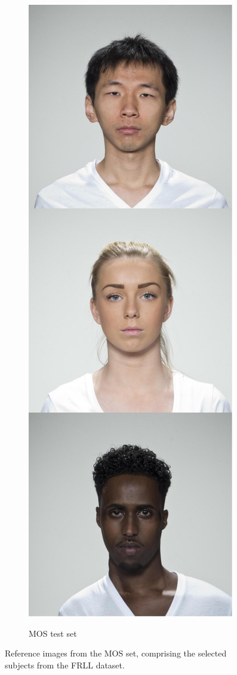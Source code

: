 \begin{figure}
\begin{subfigure}[t]{0.19\textwidth}
        \includegraphics[width=\textwidth]{images/mos_test_set.pdf}\\
        \caption{MOS test set}\label{fig:mos_set_test}
    \end{subfigure}
    \caption{Reference images from the MOS set, comprising the selected subjects from the FRLL dataset.}\label{fig:mos_set}
\end{figure}

